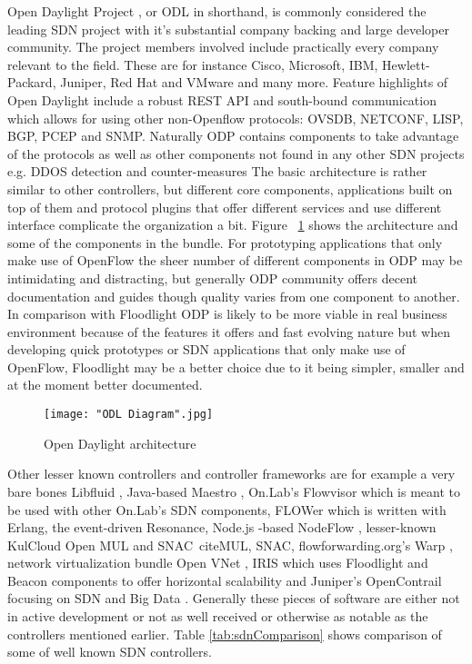 \documentclass[english]{tktltiki2}
\theoremstyle{definition}
\theoremstyle{remark}
\begin{document}
Open Daylight Project \cite{ODL}, or ODL in shorthand, is commonly considered the leading SDN project with it’s substantial company backing and large developer community. The project members involved include practically every company relevant to the field. These are for instance Cisco, Microsoft, IBM, Hewlett-Packard, Juniper, Red Hat and VMware and many more. Feature highlights of Open Daylight include  a robust REST API and south-bound communication which allows for using other non-Openflow protocols: OVSDB, NETCONF, LISP, BGP, PCEP and SNMP. Naturally ODP contains components to take advantage of the protocols as well as other components not found in any other SDN projects e.g. DDOS detection and counter-measures The basic architecture is rather similar to other controllers, but different core components, applications built on top of them and protocol plugins that offer different services and use different interface complicate the organization a bit. Figure ~\ref{fig:ODL} shows the architecture and some of the components in the bundle. For prototyping applications that only make use of OpenFlow the sheer number of different components in ODP may be intimidating and distracting, but generally ODP community offers decent documentation and guides though quality varies from one component to another. In comparison with Floodlight ODP is likely to be more viable in real business environment because of the features it offers and fast evolving nature but when developing quick prototypes or SDN applications that only make use of OpenFlow, Floodlight may be a better choice due to it being simpler, smaller and at the moment better documented.

\begin{figure}[h!t]
\centering
{}
\texttt{[image: "ODL Diagram".jpg]}
\caption{Open Daylight architecture}
\label{fig:ODL}
\end{figure}

Other lesser known controllers and controller frameworks are for example a very bare bones Libfluid \cite{Libfluid}, Java-based Maestro \cite{Maestro}, On.Lab’s Flowvisor \cite{FlowVisor} which is meant to be used with other On.Lab’s SDN components, FLOWer \cite{Flower} which is written with Erlang, the event-driven Resonance\cite{Resonance}, Node.js -based NodeFlow \cite{Nodeflow}, lesser-known KulCloud Open MUL and SNAC\ cite{MUL, SNAC}, flowforwarding.org’s Warp \cite{Warp}, network virtualization bundle Open VNet \cite{VNet}, IRIS which uses Floodlight and Beacon components to offer horizontal scalability \cite{IRIS} and Juniper’s OpenContrail focusing on SDN and Big Data \cite{Contrail}. Generally these pieces of software are either not in active development or not as well received or otherwise as notable as the controllers mentioned earlier. Table \ref{tab:sdnComparison} shows comparison of some of well known SDN controllers.  
\end{document}
